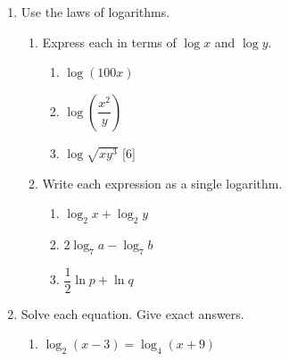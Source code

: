 \documentclass[12pt, twoside]{article}
\begin{document}
\begin{enumerate}[itemsep=0.25cm]
\begin{enumerate}[label=(\alph*), itemsep=1cm]
  \item $\log_2 m^3$
  \vspace{1cm}

  \item $\log_2(8m)$
  \vspace{1cm}

  \item $\log_4 m$
  \vspace{1cm}
\end{enumerate}

\newpage

\item[3.] Use the laws of logarithms.

\begin{enumerate}[itemsep=1.5cm]
  \item Express each in terms of $\log x$ and $\log y$.
  \begin{enumerate}[itemsep=1cm, label=(\roman*)]
    \item $\log (100x)$
    \item $\log \!\left(\dfrac{x^2}{y}\right)$
    \item $\log \sqrt{xy^3}$ \hfill [6]
  \end{enumerate}

  \item Write each expression as a single logarithm.
  \begin{enumerate}[label=(\roman*), itemsep=0.8cm]
    \item $\log_2 x + \log_2 y$
    \vspace{0.6cm}

    \item $2\log_7 a - \log_7 b$
    \vspace{0.6cm}

    \item $\dfrac{1}{2}\ln p + \ln q$
    \vspace{0.6cm}
  \end{enumerate}
\end{enumerate}

\newpage

\item[4.] Solve each equation. Give exact answers.

\begin{enumerate}[label=(\alph*), itemsep=1cm]
  \item $\log_2(x - 3) = \log_4(x + 9)$
  \vspace{1.6cm}


\end{enumerate}
\end{enumerate}
\end{document}
